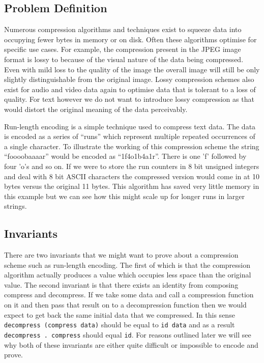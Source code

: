 \documentclass[a4paper, notitlepage]{report}
\begin{document}
\subsection{Problem Definition}
\label{sec:orgd1fd0f7}
Numerous compression algorithms and techniques exist to squeeze data into
occupying fewer bytes in memory or on disk. Often these algorithms optimise for
specific use cases. For example, the compression present in the JPEG image
format is lossy to because of the visual nature of the data being compressed.
Even with mild loss to the quality of the image the overall image will still be
only slightly distinguishable from the original image. Lossy compression schemes
also exist for audio and video data again to optimise data that is tolerant to a
loss of quality. For text however we do not want to introduce lossy compression
as that would distort the original meaning of the data perceivably.

Run-length encoding is a simple technique used to compress text data. The data
is encoded as a series of ``runs'' which represent multiple repeated occurrences
of a single character. To illustrate the working of this compression scheme the
string ``foooobaaaar'' would be encoded as ``1f4o1b4a1r''. There is one 'f'
followed by four 'o's and so on. If we were to store the run counters in 8 bit
unsigned integers and deal with 8 bit ASCII characters the compressed version
would come in at 10 bytes versus the original 11 bytes. This algorithm has saved
very little memory in this example but we can see how this might scale up for
longer runs in larger strings.

\subsection{Invariants}
\label{sec:org70fe7f4}
There are two invariants that we might want to prove about a compression scheme
such as run-length encoding. The first of which is that the compression
algorithm actually produces a value which occupies less space than the original
value. The second invariant is that there exists an identity from composing
compress and decompress. If we take some data and call a compression function on
it and then pass that result on to a decompression function then we would expect
to get back the same initial data that we compressed. In this sense \texttt{decompress
(compress data)} should be equal to \texttt{id data} and as a result \texttt{decompress . compress}
should equal \texttt{id}. For reasons outlined later we will see why both of these
invariants are either quite difficult or impossible to encode and prove.
\end{document}
